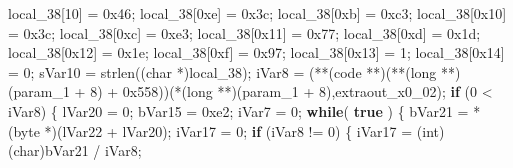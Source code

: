 \documentclass[
]{article}
\newenvironment{Shaded}{}{}
\newcommand{\BaseNTok}[1]{\textcolor[rgb]{0.25,0.63,0.44}{#1}}
\newcommand{\ControlFlowTok}[1]{\textcolor[rgb]{0.00,0.44,0.13}{\textbf{#1}}}
\newcommand{\DataTypeTok}[1]{\textcolor[rgb]{0.56,0.13,0.00}{#1}}
\newcommand{\DecValTok}[1]{\textcolor[rgb]{0.25,0.63,0.44}{#1}}
\newcommand{\KeywordTok}[1]{\textcolor[rgb]{0.00,0.44,0.13}{\textbf{#1}}}
\newcommand{\NormalTok}[1]{#1}
\newcommand{\OperatorTok}[1]{\textcolor[rgb]{0.40,0.40,0.40}{#1}}
\begin{document}
\begin{Shaded}
\begin{Highlighting}[]
\NormalTok{  local\_38}\OperatorTok{[}\DecValTok{10}\OperatorTok{]} \OperatorTok{=} \BaseNTok{0x46}\OperatorTok{;}
\NormalTok{  local\_38}\OperatorTok{[}\BaseNTok{0xe}\OperatorTok{]} \OperatorTok{=} \BaseNTok{0x3c}\OperatorTok{;}
\NormalTok{  local\_38}\OperatorTok{[}\BaseNTok{0xb}\OperatorTok{]} \OperatorTok{=} \BaseNTok{0xc3}\OperatorTok{;}
\NormalTok{  local\_38}\OperatorTok{[}\BaseNTok{0x10}\OperatorTok{]} \OperatorTok{=} \BaseNTok{0x3c}\OperatorTok{;}
\NormalTok{  local\_38}\OperatorTok{[}\BaseNTok{0xc}\OperatorTok{]} \OperatorTok{=} \BaseNTok{0xe3}\OperatorTok{;}
\NormalTok{  local\_38}\OperatorTok{[}\BaseNTok{0x11}\OperatorTok{]} \OperatorTok{=} \BaseNTok{0x77}\OperatorTok{;}
\NormalTok{  local\_38}\OperatorTok{[}\BaseNTok{0xd}\OperatorTok{]} \OperatorTok{=} \BaseNTok{0x1d}\OperatorTok{;}
\NormalTok{  local\_38}\OperatorTok{[}\BaseNTok{0x12}\OperatorTok{]} \OperatorTok{=} \BaseNTok{0x1e}\OperatorTok{;}
\NormalTok{  local\_38}\OperatorTok{[}\BaseNTok{0xf}\OperatorTok{]} \OperatorTok{=} \BaseNTok{0x97}\OperatorTok{;}
\NormalTok{  local\_38}\OperatorTok{[}\BaseNTok{0x13}\OperatorTok{]} \OperatorTok{=} \DecValTok{1}\OperatorTok{;}
\NormalTok{  local\_38}\OperatorTok{[}\BaseNTok{0x14}\OperatorTok{]} \OperatorTok{=} \DecValTok{0}\OperatorTok{;}
\NormalTok{  sVar10 }\OperatorTok{=}\NormalTok{ strlen}\OperatorTok{((}\DataTypeTok{char} \OperatorTok{*)}\NormalTok{local\_38}\OperatorTok{);}
\NormalTok{  iVar8 }\OperatorTok{=} \OperatorTok{(**(}\NormalTok{code }\OperatorTok{**)(**(}\DataTypeTok{long} \OperatorTok{**)(}\NormalTok{param\_1 }\OperatorTok{+} \DecValTok{8}\OperatorTok{)} \OperatorTok{+} \BaseNTok{0x558}\OperatorTok{))(*(}\DataTypeTok{long} \OperatorTok{**)(}\NormalTok{param\_1 }\OperatorTok{+} \DecValTok{8}\OperatorTok{),}\NormalTok{extraout\_x0\_02}\OperatorTok{);}
  \ControlFlowTok{if} \OperatorTok{(}\DecValTok{0} \OperatorTok{\textless{}}\NormalTok{ iVar8}\OperatorTok{)} \OperatorTok{\{}
\NormalTok{    lVar20 }\OperatorTok{=} \DecValTok{0}\OperatorTok{;}
\NormalTok{    bVar15 }\OperatorTok{=} \BaseNTok{0xe2}\OperatorTok{;}
\NormalTok{    iVar7 }\OperatorTok{=} \DecValTok{0}\OperatorTok{;}
    \ControlFlowTok{while}\OperatorTok{(} \KeywordTok{true} \OperatorTok{)} \OperatorTok{\{}
\NormalTok{      bVar21 }\OperatorTok{=} \OperatorTok{*(}\NormalTok{byte }\OperatorTok{*)(}\NormalTok{lVar22 }\OperatorTok{+}\NormalTok{ lVar20}\OperatorTok{);}
\NormalTok{      iVar17 }\OperatorTok{=} \DecValTok{0}\OperatorTok{;}
      \ControlFlowTok{if} \OperatorTok{(}\NormalTok{iVar8 }\OperatorTok{!=} \DecValTok{0}\OperatorTok{)} \OperatorTok{\{}
\NormalTok{        iVar17 }\OperatorTok{=} \OperatorTok{(}\DataTypeTok{int}\OperatorTok{)(}\DataTypeTok{char}\OperatorTok{)}\NormalTok{bVar21 }\OperatorTok{/}\NormalTok{ iVar8}\OperatorTok{;}

\end{Highlighting}
\end{Shaded}
\end{document}
